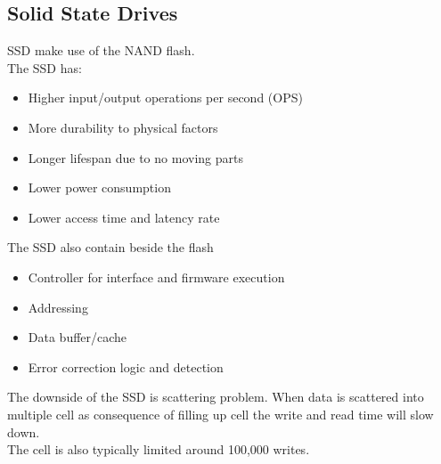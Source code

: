 \documentclass[12pt, a4paper]{article}
\begin{document}
		\subsection{Solid State Drives}
			SSD make use of the NAND flash.\\
			The SSD has:
			\begin{itemize}
				\item Higher input/output operations per second (OPS)
				\item More durability to physical factors
				\item Longer lifespan due to no moving parts
				\item Lower power consumption
				\item Lower access time and latency rate
			\end{itemize}
			The SSD also contain beside the flash
			\begin{itemize}
				\item Controller for interface and firmware execution
				\item Addressing 
				\item Data buffer/cache
				\item Error correction logic and detection
			\end{itemize}
			The downside of the SSD is scattering problem. When data is scattered into multiple cell as consequence of filling up cell the write and read time will slow down.\\
			The cell is also typically limited around 100,000 writes.
\end{document}
